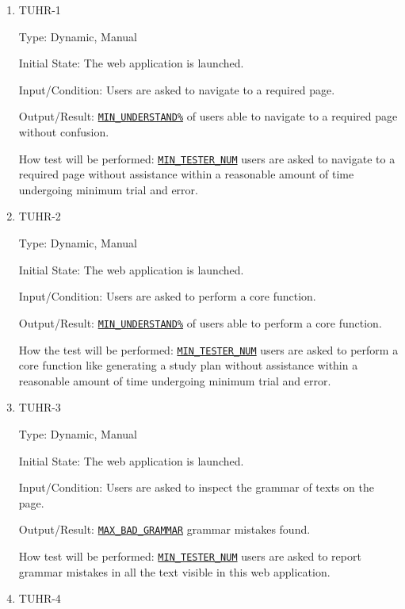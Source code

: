 \documentclass[12pt, titlepage]{article}
\begin{document}
\begin{enumerate}
\item{TUHR-1\\}\label{TUHR-1}

Type: Dynamic, Manual
					
Initial State: The web application is launched.
					
Input/Condition: Users are asked to navigate to a required page.
					
Output/Result: \hyperref[MIN_UNDERSTAND]{\texttt{MIN\_UNDERSTAND\%}} of users able to navigate to a required page without confusion.
					
How test will be performed: \hyperref[MIN_TESTER_NUM]{\texttt{MIN\_TESTER\_NUM}} users are asked to navigate to a required page without assistance within a reasonable amount of time undergoing minimum trial and error.

\item{TUHR-2\\}\label{TUHR-2}

Type: Dynamic, Manual
					
Initial State: The web application is launched.
					
Input/Condition: Users are asked to perform a core function.
					
Output/Result: \hyperref[MIN_UNDERSTAND]{\texttt{MIN\_UNDERSTAND\%}} of users able to perform a core function.
					
How the test will be performed: \hyperref[MIN_TESTER_NUM]{\texttt{MIN\_TESTER\_NUM}} users are asked to perform a core function like generating a study plan without assistance within a reasonable amount of time undergoing minimum trial and error.
\item{TUHR-3\\}\label{TUHR-3}

Type: Dynamic, Manual
					
Initial State: The web application is launched.
					
Input/Condition: Users are asked to inspect the grammar of texts on the page.
					
Output/Result: \hyperref[MAX_BAD_GRAMMAR]{\texttt{MAX\_BAD\_GRAMMAR}} grammar mistakes found.
					
How test will be performed: \hyperref[MIN_TESTER_NUM]{\texttt{MIN\_TESTER\_NUM}} users are asked to report grammar mistakes in all the text visible in this web application.

\item{TUHR-4\\}\label{TUHR-4}


\end{enumerate}
\end{document}

